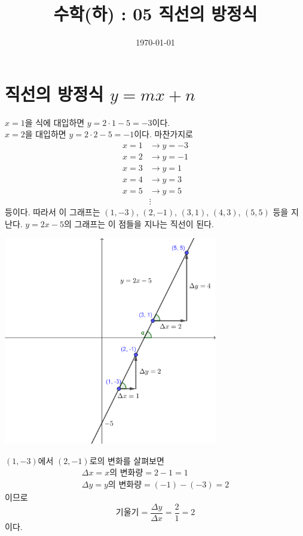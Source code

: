 \documentclass{oblivoir}
\begin{document}
\title{수학(하) : 05 직선의 방정식}
\author{}
\date{\today}
\maketitle
\tableofcontents
\newpage

\section{직선의 방정식 \(y=mx+n\)}

\label{line1}
\par\smallskip\noindent
\(x=1\)을 식에 대입하면 \(y=2\cdot1-5=-3\)이다.\\
\(x=2\)을 대입하면 \(y=2\cdot2-5=-1\)이다.
마찬가지로
\begin{align*}
x=1&\longrightarrow y=-3\\
x=2&\longrightarrow y=-1\\
x=3&\longrightarrow y=1\\
x=4&\longrightarrow y=3\\
x=5&\longrightarrow y=5\\
&\vdots
\end{align*}
등이다.
따라서 이 그래프는 \((1,-3)\), \((2,-1)\), \((3,1)\), \((4,3)\), \((5,5)\) 등을 지난다.
\(y=2x-5\)의 그래프는 이 점들을 지나는 직선이 된다.

\begin{center}
\includegraphics[width=0.7\textwidth]{line_1}
\end{center}

\clearpage
\bigskip\noindent{}\par
\((1,-3)\)에서 \((2,-1)\)로의 변화를 살펴보면
\begin{gather*}
\Delta x=x\text{의 변화량}=2-1=1\\
\Delta y=y\text{의 변화량}=(-1)-(-3)=2
\end{gather*}
이므로
\[기울기=\frac{\Delta y}{\Delta x}=\frac21=2\]
이다.
\end{document}
